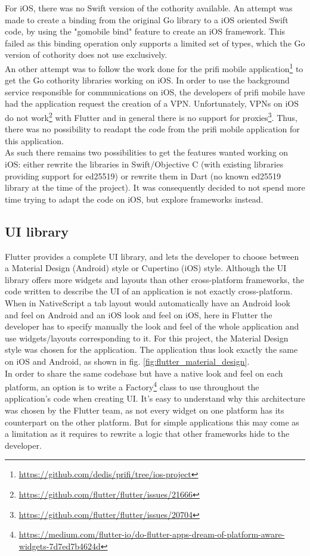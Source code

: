 \documentclass[11pt, a4paper, twoside, openright]{article} %
\begin{document}
{For iOS, there was no Swift version of the cothority available. An attempt was made to create a binding from the original Go library to a iOS oriented Swift code, by using the "gomobile bind" feature to create an iOS framework. This failed as this binding operation only supports a limited set of types, which the Go version of cothority does not use exclusively.\\
An other attempt was to follow the work done for the prifi mobile application\footnote{\url{https://github.com/dedis/prifi/tree/ios-project}} to get the Go cothority libraries working on iOS. In order to use the background service responsible for communications on iOS, the developers of prifi mobile have had the application request the creation of a VPN. Unfortunately, VPNs on iOS do not work\footnote{\url{https://github.com/flutter/flutter/issues/21666}} with Flutter and in general there is no support for proxies\footnote{\url{https://github.com/flutter/flutter/issues/20704}}. Thus, there was no possibility to readapt the code from the prifi mobile application for this application.\\
As such there remains two possibilities to get the features wanted working on iOS: either rewrite the libraries in Swift/Objective C (with existing libraries providing support for ed25519) or rewrite them in Dart (no known ed25519 library at the time of the project). It was consequently decided to not spend more time trying to adapt the code on iOS, but explore frameworks instead.

\subsection{UI library}
\label{sub:appendix_flutter_ui}
Flutter provides a complete UI library, and lets the developer to choose between a Material Design (Android) style or Cupertino (iOS) style. Although the UI library offers more widgets and layouts than other cross-platform frameworks, the code written to describe the UI of an application is not exactly cross-platform. When in NativeScript a tab layout would automatically have an Android look and feel on Android and an iOS look and feel on iOS, here in Flutter the developer has to specify manually the look and feel of the whole application and use widgets/layouts corresponding to it. For this project, the Material Design style was chosen for the application. The application thus look exactly the same on iOS and Android, as shown in fig. \ref{fig:flutter_material_design}.\\
In order to share the same codebase but have a native look and feel on each platform, an option is to write a Factory\footnote{\url{https://medium.com/flutter-io/do-flutter-apps-dream-of-platform-aware-widgets-7d7ed7b4624d}} class to use throughout the application's code when creating UI. It's easy to understand why this architecture was chosen by the Flutter team, as not every widget on one platform has its counterpart on the other platform. But for simple applications this may come as a limitation as it requires to rewrite a logic that other frameworks hide to the developer.

}
\end{document}
